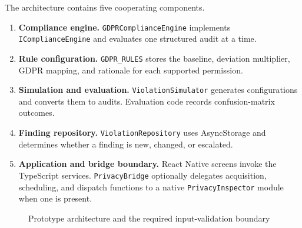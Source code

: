 The architecture contains five cooperating components.

\begin{enumerate}
    \item \textbf{Compliance engine.} \texttt{GDPRComplianceEngine} implements \texttt{IComplianceEngine} and evaluates one structured audit at a time.
    \item \textbf{Rule configuration.} \texttt{GDPR\_RULES} stores the baseline, deviation multiplier, GDPR mapping, and rationale for each supported permission.
    \item \textbf{Simulation and evaluation.} \texttt{ViolationSimulator} generates configurations and converts them to audits. Evaluation code records confusion-matrix outcomes.
    \item \textbf{Finding repository.} \texttt{ViolationRepository} uses AsyncStorage and determines whether a finding is new, changed, or escalated.
    \item \textbf{Application and bridge boundary.} React Native screens invoke the TypeScript services. \texttt{PrivacyBridge} optionally delegates acquisition, scheduling, and dispatch functions to a native \texttt{PrivacyInspector} module when one is present.
\end{enumerate}

\begin{figure}[H]
\centering
{}
\caption{Prototype architecture and the required input-validation boundary}
\label{fig:final-architecture}
\end{figure}

